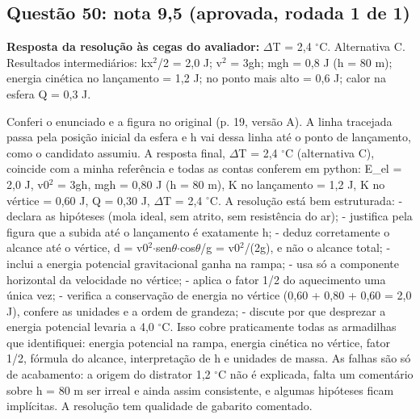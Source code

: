 \documentclass{article}%
\begin{document}
\subsection*{Questão 50: nota 9,5 (aprovada, rodada 1 de 1)}%
\textbf{Resposta da resolução às cegas do avaliador:} $\Delta$T = 2,4 $^\circ$C. Alternativa C.\newline%
Resultados intermediários: kx$^2$/2 = 2,0 J; v$^2$ = 3gh; mgh = 0,8 J (h = 80 m); energia cinética no lançamento = 1,2 J; no ponto mais alto = 0,6 J; calor na esfera Q = 0,3 J.\par %
Conferi o enunciado e a figura no original (p. 19, versão A). A linha tracejada passa pela posição inicial da esfera e h vai dessa linha até o ponto de lançamento, como o candidato assumiu. A resposta final, $\Delta$T = 2,4 $^\circ$C (alternativa C), coincide com a minha referência e todas as contas conferem em python: E\_el = 2,0 J, v0$^2$ = 3gh, mgh = 0,80 J (h = 80 m), K no lançamento = 1,2 J, K no vértice = 0,60 J, Q = 0,30 J, $\Delta$T = 2,4 $^\circ$C.\newline%
\newline%
A resolução está bem estruturada:\newline%
{-} declara as hipóteses (mola ideal, sem atrito, sem resistência do ar);\newline%
{-} justifica pela figura que a subida até o lançamento é exatamente h;\newline%
{-} deduz corretamente o alcance até o vértice, d = v0$^2$$\cdot$sen$\theta$$\cdot$cos$\theta$/g = v0$^2$/(2g), e não o alcance total;\newline%
{-} inclui a energia potencial gravitacional ganha na rampa;\newline%
{-} usa só a componente horizontal da velocidade no vértice;\newline%
{-} aplica o fator 1/2 do aquecimento uma única vez;\newline%
{-} verifica a conservação de energia no vértice (0,60 + 0,80 + 0,60 = 2,0 J), confere as unidades e a ordem de grandeza;\newline%
{-} discute por que desprezar a energia potencial levaria a 4,0 $^\circ$C.\newline%
\newline%
Isso cobre praticamente todas as armadilhas que identifiquei: energia potencial na rampa, energia cinética no vértice, fator 1/2, fórmula do alcance, interpretação de h e unidades de massa. As falhas são só de acabamento: a origem do distrator 1,2 $^\circ$C não é explicada, falta um comentário sobre h = 80 m ser irreal e ainda assim consistente, e algumas hipóteses ficam implícitas. A resolução tem qualidade de gabarito comentado.%
\end{document}
